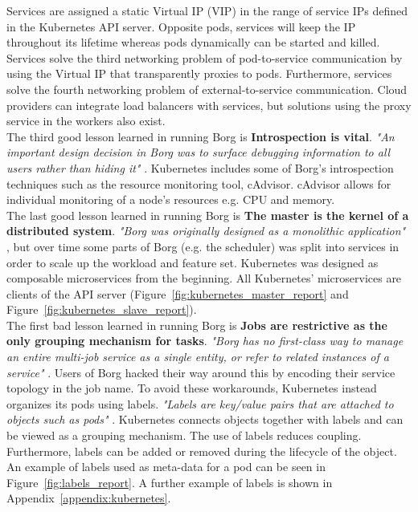 \noindent 
Services are assigned a static Virtual IP (VIP) in the range of service IPs defined in the Kubernetes API server. Opposite pods, services will keep the IP throughout its lifetime whereas pods dynamically can be started and killed. Services solve the third networking problem of pod-to-service communication by using the Virtual IP that transparently proxies to pods. Furthermore, services solve the fourth networking problem of external-to-service communication. Cloud providers can integrate load balancers with services, but solutions using the proxy service in the workers also exist. \\

\noindent
The third good lesson learned in running Borg is \textbf{Introspection is vital}. \textit{"An important design decision in Borg was to surface debugging information to all users rather than hiding it"} \cite[p. 14]{verma2015borg}. Kubernetes includes some of Borg's introspection techniques such as the resource monitoring tool, cAdvisor. cAdvisor allows for individual monitoring of a node's resources e.g. CPU and memory. \\

\noindent
The last good lesson learned in running Borg is \textbf{The master is the kernel of a distributed system}. \textit{"Borg was originally designed as a monolithic application"} \cite[p. 14]{verma2015borg}, but over time some parts of Borg (e.g. the scheduler) was split into services in order to scale up the workload and feature set. Kubernetes was designed as composable microservices from the beginning. All Kubernetes' microservices are clients of the API server (Figure~\ref{fig:kubernetes_master_report} and Figure~\ref{fig:kubernetes_slave_report}). \\ 

\noindent
The first bad lesson learned in running Borg is \textbf{Jobs are restrictive as the only grouping mechanism for tasks}. \textit{"Borg has no first-class way to manage an entire multi-job service as a single entity, or refer to related instances of a service"} \cite[p. 14]{verma2015borg}. Users of Borg hacked their way around this by encoding their service topology in the job name. To avoid these workarounds, Kubernetes instead organizes its pods using labels. \textit{"Labels are key/value pairs that are attached to objects such as pods"} \cite{kubernetesio}. Kubernetes connects objects together with labels and can be viewed as a grouping mechanism. The use of labels reduces coupling. Furthermore, labels can be added or removed during the lifecycle of the object. An example of labels used as meta-data for a pod can be seen in Figure~\ref{fig:labels_report}. A further example of labels is shown in Appendix~\ref{appendix:kubernetes}.

